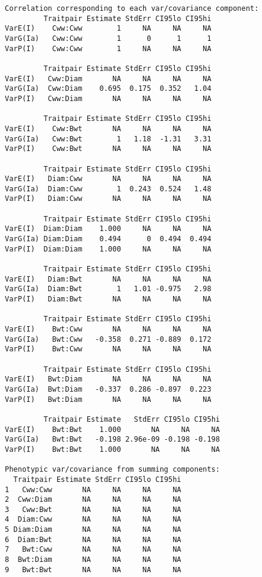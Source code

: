 \documentclass[titlepage]{article}  %
\begin{document}
\begin{verbatim}
Correlation corresponding to each var/covariance component:
         Traitpair Estimate StdErr CI95lo CI95hi
VarE(I)    Cww:Cww        1     NA     NA     NA
VarG(Ia)   Cww:Cww        1      0      1      1
VarP(I)    Cww:Cww        1     NA     NA     NA

         Traitpair Estimate StdErr CI95lo CI95hi
VarE(I)   Cww:Diam       NA     NA     NA     NA
VarG(Ia)  Cww:Diam    0.695  0.175  0.352   1.04
VarP(I)   Cww:Diam       NA     NA     NA     NA

         Traitpair Estimate StdErr CI95lo CI95hi
VarE(I)    Cww:Bwt       NA     NA     NA     NA
VarG(Ia)   Cww:Bwt        1   1.18  -1.31   3.31
VarP(I)    Cww:Bwt       NA     NA     NA     NA

         Traitpair Estimate StdErr CI95lo CI95hi
VarE(I)   Diam:Cww       NA     NA     NA     NA
VarG(Ia)  Diam:Cww        1  0.243  0.524   1.48
VarP(I)   Diam:Cww       NA     NA     NA     NA

         Traitpair Estimate StdErr CI95lo CI95hi
VarE(I)  Diam:Diam    1.000     NA     NA     NA
VarG(Ia) Diam:Diam    0.494      0  0.494  0.494
VarP(I)  Diam:Diam    1.000     NA     NA     NA

         Traitpair Estimate StdErr CI95lo CI95hi
VarE(I)   Diam:Bwt       NA     NA     NA     NA
VarG(Ia)  Diam:Bwt        1   1.01 -0.975   2.98
VarP(I)   Diam:Bwt       NA     NA     NA     NA

         Traitpair Estimate StdErr CI95lo CI95hi
VarE(I)    Bwt:Cww       NA     NA     NA     NA
VarG(Ia)   Bwt:Cww   -0.358  0.271 -0.889  0.172
VarP(I)    Bwt:Cww       NA     NA     NA     NA

         Traitpair Estimate StdErr CI95lo CI95hi
VarE(I)   Bwt:Diam       NA     NA     NA     NA
VarG(Ia)  Bwt:Diam   -0.337  0.286 -0.897  0.223
VarP(I)   Bwt:Diam       NA     NA     NA     NA

         Traitpair Estimate   StdErr CI95lo CI95hi
VarE(I)    Bwt:Bwt    1.000       NA     NA     NA
VarG(Ia)   Bwt:Bwt   -0.198 2.96e-09 -0.198 -0.198
VarP(I)    Bwt:Bwt    1.000       NA     NA     NA

Phenotypic var/covariance from summing components:
  Traitpair Estimate StdErr CI95lo CI95hi
1   Cww:Cww       NA     NA     NA     NA
2  Cww:Diam       NA     NA     NA     NA
3   Cww:Bwt       NA     NA     NA     NA
4  Diam:Cww       NA     NA     NA     NA
5 Diam:Diam       NA     NA     NA     NA
6  Diam:Bwt       NA     NA     NA     NA
7   Bwt:Cww       NA     NA     NA     NA
8  Bwt:Diam       NA     NA     NA     NA
9   Bwt:Bwt       NA     NA     NA     NA




\end{verbatim}
\end{document}
